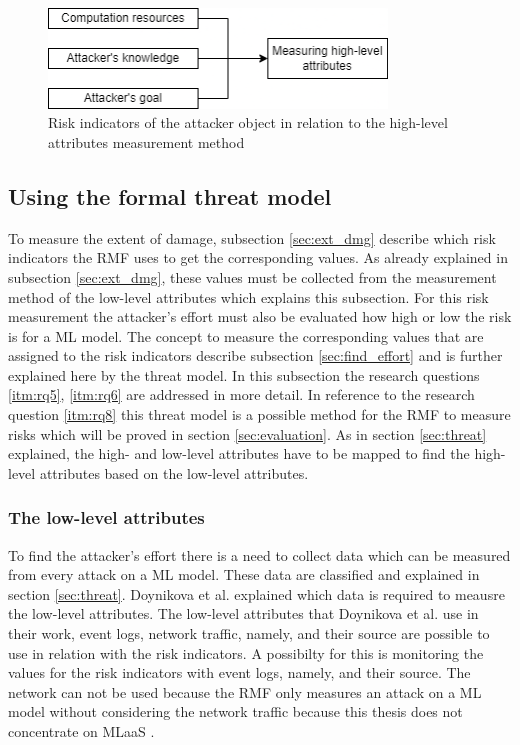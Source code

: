 \begin{figure}[ht!]
  \centering
  \includegraphics[width=9cm]{pictures/measure_effort.png}
  \caption{Risk indicators of the attacker object in relation to the high-level attributes measurement method}
  \label{fig:measure_effort}
\end{figure}

\subsection{Using the formal threat model}
\label{sec:use_threat_model}

To measure the extent of damage, subsection \ref{sec:ext_dmg} describe which risk indicators the RMF uses to get the corresponding values. As already explained in subsection \ref{sec:ext_dmg}, these values must be collected from the measurement method of the low-level attributes which explains this subsection. For this risk measurement the attacker's effort must also be evaluated how high or low the risk is for a ML model. The concept to measure the corresponding values that are assigned to the risk indicators describe subsection \ref{sec:find_effort} and is further explained here by the threat model. In this subsection the research questions \ref{itm:rq5}, \ref{itm:rq6} are addressed in more detail. In reference to the research question \ref{itm:rq8} this threat model is a
possible method for the RMF to measure risks which will be proved in section \ref{sec:evaluation}. As in section \ref{sec:threat} explained, the high- and low-level attributes have to be mapped to find the high-level attributes based on the low-level attributes.

\subsubsection*{The low-level attributes}

To find the attacker's effort there is a need to collect data which can be measured from every attack on a ML model. These data are classified and explained in section \ref{sec:threat}. Doynikova et al. \cite{DBLP:conf/crisis/DoynikovaNGK20} explained which data is required to meausre the low-level attributes. The low-level attributes that Doynikova et al. use in their work, event logs, network traffic, namely, and their source are possible to use in relation with the risk indicators. A possibilty for this is monitoring the values for the risk indicators with event logs, namely, and their source. The network can not be used because the RMF only measures an attack on a ML model without considering the network traffic because this thesis does not concentrate on MLaaS \cite{DBLP:conf/hci/HaraA21}.

